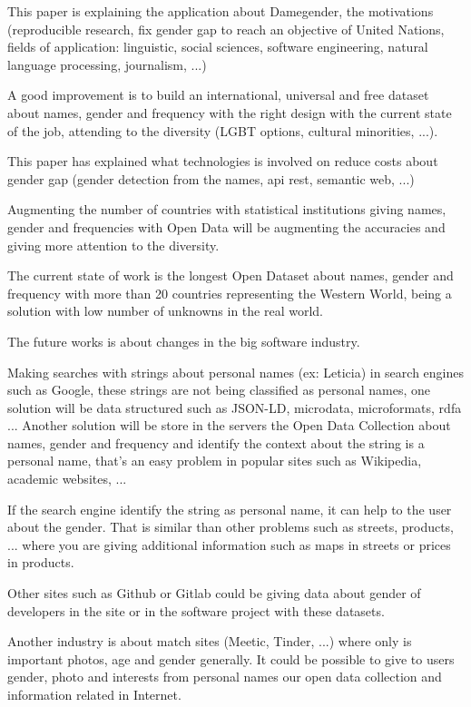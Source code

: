 \documentclass[a4paper]{article}
\begin{document}
This paper is explaining the application about Damegender, the
motivations (reproducible research, fix gender gap to reach an
objective of United Nations, fields of application: linguistic, social
sciences, software engineering, natural language processing,
journalism, ...)

A good improvement is to build an international, universal and free
dataset about names, gender and frequency with the right design with
the current state of the job, attending to the diversity (LGBT
options, cultural minorities, ...).

This paper has explained what technologies is involved on reduce costs
about gender gap (gender detection from the names, api rest, semantic
web, ...)

Augmenting the number of countries with statistical institutions
giving names, gender and frequencies with Open Data will be augmenting
the accuracies and giving more attention to the diversity.

The current state of work is the longest Open Dataset about names,
gender and frequency with more than 20 countries representing the
Western World, being a solution with low number of unknowns in the real
world.

The future works is about changes in the big software industry.

Making searches with strings about personal names (ex: Leticia) in
search engines such as Google, these strings are not being classified
as personal names, one solution will be data structured such as
JSON-LD, microdata, microformats, rdfa ... Another solution will be
store in the servers the Open Data Collection about names, gender and
frequency and identify the context about the string is a personal
name, that's an easy problem in popular sites such as Wikipedia,
academic websites, ...

If the search engine identify the string as personal name, it can help
to the user about the gender. That is similar than other problems such
as streets, products, ... where you are giving additional information
such as maps in streets or prices in products.

Other sites such as Github or Gitlab could be giving data about
gender of developers in the site or in the software project with these
datasets.

Another industry is about match sites (Meetic, Tinder, ...) where only
is important photos, age and gender generally. It could be possible to give
to users gender, photo and interests from personal names our open data
collection and information related in Internet.
\end{document}
